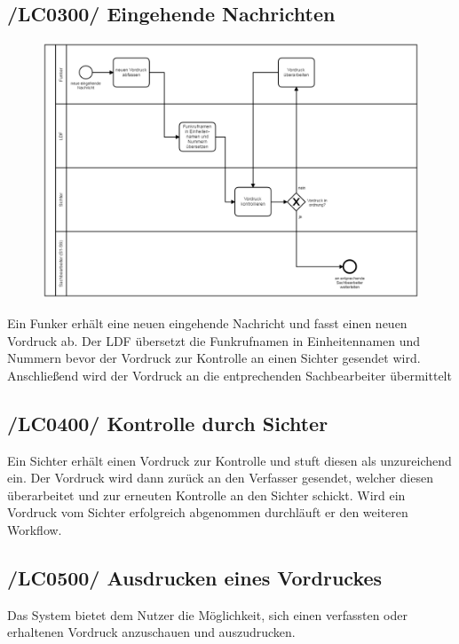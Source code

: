\subsection{/LC0300/ Eingehende Nachrichten} 
\begin{figure}[htpb]
	\centering
	\includegraphics[width=0.95\linewidth]{eingehend.png}
\end{figure} Ein Funker erhält eine neuen eingehende Nachricht und fasst einen neuen Vordruck ab. Der LDF übersetzt die Funkrufnamen in Einheitennamen und Nummern bevor der Vordruck zur Kontrolle an einen Sichter gesendet wird. Anschließend wird der Vordruck an die entprechenden Sachbearbeiter übermittelt

\subsection{/LC0400/ Kontrolle durch Sichter}
Ein Sichter erhält einen Vordruck zur Kontrolle und stuft diesen als unzureichend ein. Der Vordruck wird dann zurück an den Verfasser gesendet, welcher diesen überarbeitet und zur erneuten Kontrolle an den Sichter schickt. Wird ein Vordruck vom Sichter erfolgreich abgenommen durchläuft er den weiteren Workflow.

\subsection{/LC0500/ Ausdrucken eines Vordruckes}
Das System bietet dem Nutzer die Möglichkeit, sich einen verfassten oder erhaltenen Vordruck anzuschauen und auszudrucken.